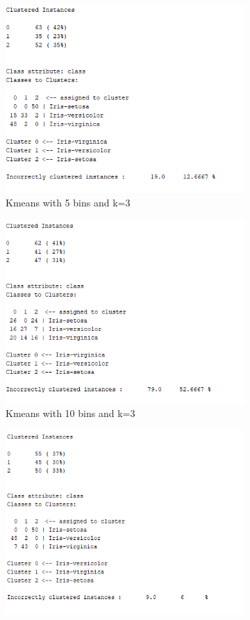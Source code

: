 \documentclass[letterpaper,12pt]{article}
\begin{document}
\begin{figure}[H]
\begin{subfigure}{.5\textwidth}
  \centering
  \includegraphics[width=.8\linewidth]{5bins_3cl_output}  
  \caption{Kmeans with 5 bins and k=3}
  \label{fig:sub-first_2}
\end{subfigure}
\begin{subfigure}{.5\textwidth}
  \centering
  \includegraphics[width=.8\linewidth]{10_bins_3cl_output}  
  \caption{Kmeans with 10 bins and k=3}
  \label{fig:sub-second_2}
\end{subfigure}
\begin{subfigure}{.5\textwidth}
  \centering
  \includegraphics[width=.8\linewidth]{3bins_3cl_output}  

\end{subfigure}
\end{figure}
\end{document}
